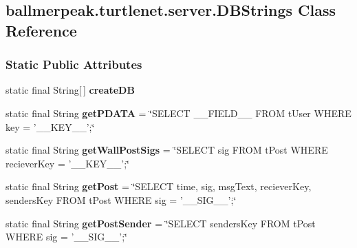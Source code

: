 \hypertarget{classballmerpeak_1_1turtlenet_1_1server_1_1DBStrings}{\subsection{ballmerpeak.\-turtlenet.\-server.\-D\-B\-Strings Class Reference}
\label{classballmerpeak_1_1turtlenet_1_1server_1_1DBStrings}
}
\subsubsection*{Static Public Attributes}
\begin{DoxyCompactItemize}
\item 
\hypertarget{classballmerpeak_1_1turtlenet_1_1server_1_1DBStrings_a70ba551ea4397e98cc09b96eb0d9ff43}{static final String\mbox{[}$\,$\mbox{]} {\bfseries create\-D\-B}}\label{classballmerpeak_1_1turtlenet_1_1server_1_1DBStrings_a70ba551ea4397e98cc09b96eb0d9ff43}

\item 
\hypertarget{classballmerpeak_1_1turtlenet_1_1server_1_1DBStrings_a93ae46feb4aaeb78cac2ba7b4fce04ec}{static final String {\bfseries get\-P\-D\-A\-T\-A} = \char`\"{}S\-E\-L\-E\-C\-T \-\_\-\-\_\-\-F\-I\-E\-L\-D\-\_\-\-\_\- F\-R\-O\-M t\-User W\-H\-E\-R\-E key = '\-\_\-\-\_\-\-K\-E\-Y\-\_\-\-\_\-';\char`\"{}}\label{classballmerpeak_1_1turtlenet_1_1server_1_1DBStrings_a93ae46feb4aaeb78cac2ba7b4fce04ec}

\item 
\hypertarget{classballmerpeak_1_1turtlenet_1_1server_1_1DBStrings_abc7b51ce40123124593dc92582e256b0}{static final String {\bfseries get\-Wall\-Post\-Sigs} = \char`\"{}S\-E\-L\-E\-C\-T sig F\-R\-O\-M t\-Post W\-H\-E\-R\-E reciever\-Key = '\-\_\-\-\_\-\-K\-E\-Y\-\_\-\-\_\-';\char`\"{}}\label{classballmerpeak_1_1turtlenet_1_1server_1_1DBStrings_abc7b51ce40123124593dc92582e256b0}

\item 
\hypertarget{classballmerpeak_1_1turtlenet_1_1server_1_1DBStrings_a80f3d94ed94b75193a7fd3490548739b}{static final String {\bfseries get\-Post} = \char`\"{}S\-E\-L\-E\-C\-T time, sig, msg\-Text, reciever\-Key, senders\-Key F\-R\-O\-M t\-Post W\-H\-E\-R\-E sig = '\-\_\-\-\_\-\-S\-I\-G\-\_\-\-\_\-';\char`\"{}}\label{classballmerpeak_1_1turtlenet_1_1server_1_1DBStrings_a80f3d94ed94b75193a7fd3490548739b}

\item 
\hypertarget{classballmerpeak_1_1turtlenet_1_1server_1_1DBStrings_ad87c5a646e57a7280c16bc34c599eba2}{static final String {\bfseries get\-Post\-Sender} = \char`\"{}S\-E\-L\-E\-C\-T senders\-Key F\-R\-O\-M t\-Post W\-H\-E\-R\-E sig = '\-\_\-\-\_\-\-S\-I\-G\-\_\-\-\_\-';\char`\"{}}\label{classballmerpeak_1_1turtlenet_1_1server_1_1DBStrings_ad87c5a646e57a7280c16bc34c599eba2}


\end{DoxyCompactItemize}
